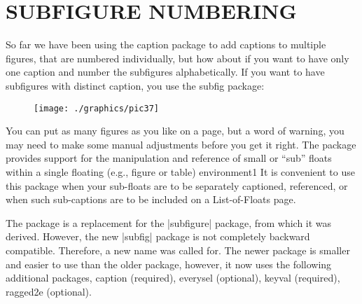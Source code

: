\chapter{SUBFIGURE NUMBERING}
So far we have been using the caption package to add captions to multiple figures, that are numbered individually, but how about if you want to have only one caption and number the subfigures alphabetically. If you want to have subfigures with distinct caption, you use the subfig package:






\begin{figure}[htp]%

\texttt{[image: ./graphics/pic37]}
\end{figure}


You can put as many figures as you like on a page, but a word of warning, you may need to make some manual adjustments before you get it right. The package provides support for the manipulation and reference of small or \enquote{sub} floats within a single floating (e.g., figure or table) environment1 It is convenient to use this
package when your sub-floats are to be separately captioned, referenced, or when such
sub-captions are to be included on a List-of-Floats page.

The package is a replacement for the |subfigure| package, from which it was derived.
However, the new |subfig| package is not completely backward compatible.
Therefore, a new name was called for. The newer package is smaller and easier to use
than the older package, however, it now uses the following additional packages,  caption (required),  everysel (optional),
keyval (required),  ragged2e (optional).

